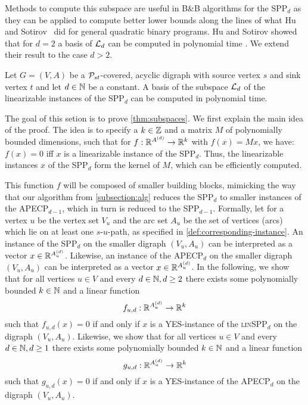 Methods to compute this subspace 
are useful in
B\&B algorithms 
for the SPP$_d$ as they can be applied to compute
better lower bounds along the lines of what Hu and Sotirov~\cite{huSo2021} did for general quadratic binary programs.
Hu and Sotirov showed that for $d = 2$ a basis of ${\cal L}_d$ can be computed in polynomial time \cite[Prop. 5]{huSo2021}.
We extend their result 
to the case  $d > 2$.
\begin{theorem}
\label{thm:subspaces}
Let $G = (V, A)$ be  a $\mathcal{P}_{st}$-covered, acyclic digraph with source vertex $s$ and sink vertex $t$ and let   $d \in \mathbb{N}$ be a constant.  A basis of the subspace ${\cal L}_d$  of the  linearizable instances of the SPP$_d$  can be computed in polynomial time.  
\end{theorem}


The goal of this setion is to prove \cref{thm:subspaces}. We first explain the main idea of the proof. The idea is to specify  a  $k\in \mathbb{Z}$ and  a  matrix $M$ of 
polynomially bounded dimensions, 
such that for  $f: \mathbb{R}^{A^{(d)}} \rightarrow \mathbb{R}^k$ with  $f(x)=Mx$,  we have:
$f(x) = 0$ 
iff
$x$ is  a linearizable instance of the SPP$_d$. Thus,  the linearizable instances $x$ of the SPP$_d$ 
form the kernel of $M$, which can be efficiently computed.

This function $f$ will be composed of smaller building blocks, mimicking the way that our algorithm from \cref{subsection:alg} reduces the SPP$_d$ to smaller instances of the APECP$_{d-1}$, which in turn is reduced to the SPP$_{d-1}$. Formally, let for a vertex $u$ be the vertex set $V_u$ and the arc set $A_u$ be the set of vertices (arcs) which lie on at least one $s$-$u$-path, as specified in \cref{def:corresponding-instance}. An instance of the SPP$_{d}$ on the smaller digraph $(V_u, A_u)$ can be interpreted as a vector $x \in \mathbb{R}^{A_u^{(d)}}$. Likewise, an instance of the APECP$_{d}$ on the smaller digraph $(V_u, A_u)$ can be interpreted as a vector $x \in \mathbb{R}^{A_u^{(d)}}$. In the following, we show that for all vertices $u \in V$ and every $d \in \mathbb{N}, d\geq 2$ there exists some polynomially bounded $k \in \mathbb{N}$ and a linear function
\[
f_{u,d} : \mathbb{R}^{A_u^{(d)}} \rightarrow \mathbb{R}^k
\]
such that $f_{u,d}(x) = 0$ if and only if $x$ is a YES-instance of the \textsc{lin}SPP$_d$ on the digraph $(V_u, A_u)$. Likewise, we show that for all vertices $u \in V$ and every $d \in \mathbb{N}, d\geq 1$ there exists some polynomially bounded $k \in \mathbb{N}$ and a linear function
\[
g_{u,d} : \mathbb{R}^{A_u^{(d)}} \rightarrow \mathbb{R}^k
\]
such that $g_{u,d}(x) = 0$ if and only if $x$ is a YES-instance of the APECP$_{d}$ on the digraph $(V_u, A_u)$. 

